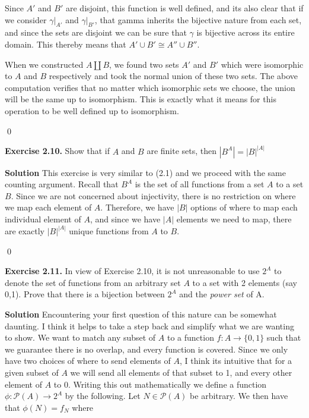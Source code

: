 \documentclass[titlepage]{article}
\begin{document}
Since $A'$ and $B'$ are disjoint, this function is well defined, and its also clear that if we consider $\gamma\vert_{A'}$ and $\gamma\vert_{B'}$, that gamma inherits the bijective nature from each set, and since the sets are disjoint we can be sure that $\gamma$ is bijective across its entire domain. This thereby means that $A' \cup B' \cong A'' \cup B''$.


When we constructed $A \amalg B$, we found two sets $A'$ and $B'$ which were isomorphic to $A$ and $B$ respectively and took the normal union of these two sets. The above computation verifies that no matter which isomorphic sets we choose, the union will be the same up to isomorphism. This is exactly what it means for this operation to be well defined up to isomorphism.

\qed

\bigskip

\textbf{Exercise 2.10.} Show that if $A$ and $B$ are finite sets, then $|B^A|=|B|^{|A|}$

\medskip

\textbf{Solution} This exercise is very similar to (2.1) and we proceed with the same counting argument. Recall that $B^A$ is the set of all functions from a set $A$ to a set $B$. Since we are not concerned about injectivity, there is no restriction on where we map each element of $A$. Therefore, we have $|B|$ options of where to map each individual element of $A$, and since we have $|A|$ elements we need to map, there are exactly $|B|^{|A|}$ unique functions from $A$ to $B$.

\qed

\bigskip

\textbf{Exercise 2.11.} In view of Exercise 2.10, it is not unreasonable to use $2^A$ to denote the set of functions from an arbitrary set $A$ to a set with 2 elements (say {0,1}). Prove that there is a bijection between $2^A$ and the \textit{power set} of A.


\textbf{Solution} Encountering your first question of this nature can be somewhat daunting. I think it helps to take a step back and simplify what we are wanting to show. We want to match any subset of $A$ to a function $f:A \to \{0,1\}$ such that we guarantee there is no overlap, and every function is covered. Since we only have two choices of where to send elements of $A$, I think its intuitive that for a given subset of $A$ we will send all elements of that subset to 1, and every other element of $A$ to 0. Writing this out mathematically we define a function $\phi: \mathscr{P}(A) \to 2^A$ by the following. Let $N \in \mathscr{P}(A)$ be arbitrary. We then have that $\phi(N) = f_N$ where
\end{document}
